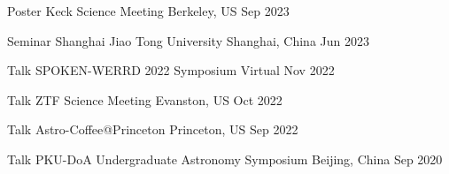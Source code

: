\begin{cventries}
	\cvsimsimpentry
	{Poster}
	{Keck Science Meeting}
	{Berkeley, US}
	{Sep 2023}

	\cvsimsimpentry
	{Seminar}
	{Shanghai Jiao Tong University}
	{Shanghai, China}
	{Jun 2023}

	\cvsimsimpentry
	{Talk}
	{SPOKEN-WERRD 2022 Symposium} %
	{Virtual} %
	{Nov 2022} %

	\cvsimsimpentry
	{Talk} %
	{ZTF Science Meeting} %
	{Evanston, US} %
	{Oct 2022} %

	\cvsimsimpentry
	{Talk} %
	{Astro-Coffee@Princeton} %
	{Princeton, US} %
	{Sep 2022} %
	
	\cvsimsimpentry
	{Talk} %
	{PKU-DoA Undergraduate Astronomy Symposium} %
	{Beijing, China} %
	{Sep 2020} %

\end{cventries}